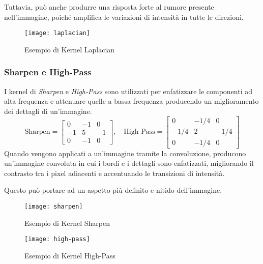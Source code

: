 Tuttavia, può anche produrre una risposta forte al rumore presente nell'immagine, poiché amplifica le variazioni di intensità in tutte le direzioni.
\begin{figure}[H]
	\centering
	\texttt{[image: laplacian]}
	\caption{Esempio di Kernel Laplacian}
\end{figure}
\subsubsection{Sharpen e High-Pass}
I kernel di \textit{Sharpen} e \textit{High-Pass} sono utilizzati per enfatizzare le componenti ad alta frequenza e attenuare quelle a bassa frequenza producendo un miglioramento dei dettagli di un'immagine.\newline
\begin{equation*}
	\text {Sharpen} = 
	\begin{bmatrix}
		0 & -1 & 0 \\
		-1 & 5 & -1 \\
		0 & -1 & 0
	\end{bmatrix},
	\quad
	\text {High-Pass} = 
	\begin{bmatrix}
		0 & -1/4 & 0 \\
		-1/4 & 2 & -1/4 \\
		0 & -1/4 & 0
	\end{bmatrix}
\end{equation*}
\newline Quando vengono applicati a un'immagine tramite la convoluzione, producono un'immagine convoluta in cui i bordi e i dettagli sono enfatizzati, migliorando il contrasto tra i pixel adiacenti e accentuando le transizioni di intensità.

Questo può portare ad un aspetto più definito e nitido dell'immagine.
\begin{figure}[H]
	\centering
	\texttt{[image: sharpen]}
	\caption{Esempio di Kernel Sharpen}
\end{figure}
\begin{figure}[H]
	\centering
	\texttt{[image: high-pass]}
	\caption{Esempio di Kernel High-Pass}
\end{figure}
